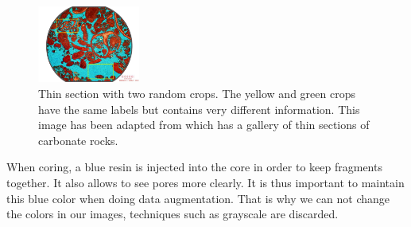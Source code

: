 \begin{figure}[h]
    \centering
        \includegraphics[width=0.3\textwidth]{figures/03-cropping_example_with2crops}
        \caption[Thin section with 2 random crops]{ Thin section with two random crops. The yellow and green crops have the same labels but contains very different information. This image has been adapted from \cite{section} which has a gallery of thin sections of carbonate rocks. }
        \label{fig:crops}
\end{figure}

When coring, a blue resin is injected into the core in order to keep fragments together. It also allows to see pores more clearly. It is thus important to maintain this blue color when doing data augmentation. That is why we can not change the colors in our images, techniques such as grayscale are discarded.


